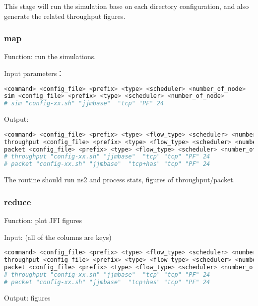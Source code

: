 This stage will run the simulation base on each directory configuration,
and also generate the related throughput figures.


\subsubsection{map}
Function: run the simulations.


Input parameters：
\begin{lstlisting}[language=bash]
<command> <config_file> <prefix> <type> <scheduler> <number_of_node>
sim <config_file> <prefix> <type> <scheduler> <number_of_node>
# sim "config-xx.sh" "jjmbase"  "tcp" "PF" 24
\end{lstlisting}


Output:
\begin{lstlisting}[language=bash]
<command> <config_file> <prefix> <type> <flow_type> <scheduler> <number_of_node>
throughput <config_file> <prefix> <type> <flow_type> <scheduler> <number_of_node>
packet <config_file> <prefix> <type> <flow_type> <scheduler> <number_of_node>
# throughput "config-xx.sh" "jjmbase"  "tcp" "tcp" "PF" 24
# packet "config-xx.sh" "jjmbase"  "tcp+has" "tcp" "PF" 24
\end{lstlisting}

The routine should run ns2 and process stats, figures of throughput/packet.




\subsubsection{reduce}
Function: plot JFI figures


Input: (all of the columns are keys)
\begin{lstlisting}[language=bash]
<command> <config_file> <prefix> <type> <flow_type> <scheduler> <number_of_node>
throughput <config_file> <prefix> <type> <flow_type> <scheduler> <number_of_node>
packet <config_file> <prefix> <type> <flow_type> <scheduler> <number_of_node>
# throughput "config-xx.sh" "jjmbase"  "tcp" "tcp" "PF" 24
# packet "config-xx.sh" "jjmbase"  "tcp+has" "tcp" "PF" 24
\end{lstlisting}

Output: figures

